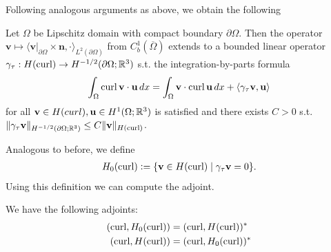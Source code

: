 \documentclass[../master_thesis.tex]{subfiles}
\begin{document}
Following analogous arguments as above, we obtain the following 
\begin{theorem}\label{thm:trace_hcurl}
    Let $\Omega$ be Lipschitz domain with compact boundary $\partial \Omega$.
    Then the operator $\mathbf{v} \mapsto 
    \langle \mathbf{v}|_{\partial \Omega} \times \mathbf{n}, \cdot \rangle_{L^2(\partial \Omega)}$ 
    from $C^1_b(\overline{\Omega})$ extends to a bounded linear operator 
    $\gamma_\tau: H(\operatorname{curl}) \rightarrow H^{-1/2}(\partial \Omega; \mathbb{R}^3)$ 
    s.t. the integration-by-parts formula 
    \begin{align*}
        \int_\Omega \operatorname{curl} \mathbf{v} \cdot \mathbf{u} \, dx = 
            \int_\Omega \mathbf{v} \cdot \operatorname{curl} \mathbf{u} \, dx
            + \langle \gamma_\tau \mathbf{v}, \mathbf{u} \rangle
    \end{align*}
    for all $\mathbf{v} \in H(curl), \mathbf{u} \in H^1(\Omega;\mathbb{R}^3)$
    is satisfied and there exists $C>0$ s.t.
    $\lVert \gamma_\tau \mathbf{v} \rVert _{H^{-1/2}(\partial \Omega; \mathbb{R}^3)} 
    \leq C \lVert \mathbf{v} \rVert _{H(\operatorname{curl})}$. 
\end{theorem}
Analogous to before, we define 
\begin{align*}
    H_0(\operatorname{curl}) \vcentcolon= \{ \mathbf{v} \in H(\operatorname{curl}) \mid \gamma_\tau \mathbf{v} = 0\}.
\end{align*}
Using this definition we can compute the adjoint.
\begin{theorem}
    We have the following adjoints:
    \begin{align*}
        (\operatorname{curl}, H_0(\operatorname{curl})) &= (\operatorname{curl}, H(\operatorname{curl}))^* 
        \\ (\operatorname{curl}, H(\operatorname{curl})) &= (\operatorname{curl}, H_0(\operatorname{curl}))^* 
    \end{align*}
\end{theorem}
\end{document}

